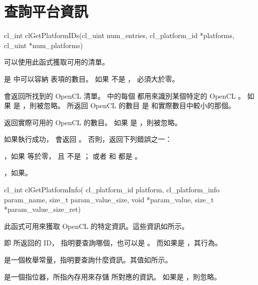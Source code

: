 \section{查詢平台資訊}


\startCLFUNC
cl_int clGetPlatformIDs(cl_uint num_entries,
			cl_platform_id *platforms,
			cl_uint *num_platforms)
\stopCLFUNC

可以使用此函式獲取可用的清單。

 是  中可以容納  表項的數目。
如果  不是 ，  必須大於零。

 會返回所找到的 OpenCL  清單。
 中的每個 
都用來識別某個特定的 OpenCL 。
如果  是 ，則被忽略。
所返回 OpenCL  的數目 是  和實際數目中較小的那個。

 返回實際可用的 OpenCL  的數目。
如果  是 ，則被忽略。

如果執行成功， 會返回 。
否則，返回下列錯誤之一：
\startigBase
\item {}，如果  等於零，
且  不是 ；
或者  和  都是 。

\item {}，如果\schostfailres。
\stopigBase


\startCLFUNC
cl_int clGetPlatformInfo(
		cl_platform_id platform,
		cl_platform_info param_name,
		size_t param_value_size,
		void *param_value,
		size_t *param_value_size_ret)
\stopCLFUNC

此函式可用來獲取 OpenCL 的特定資訊。這些資訊如所示。

 即  所返回的 ID，
指明要查詢哪個，也可以是 。
而如果是 ，其行為。

 是一個枚舉常量，指明要查詢什麼資訊。其值如所示。

 是一個指位器，所指內存用來存儲  所對應的資訊。
如果是 ，則忽略。

